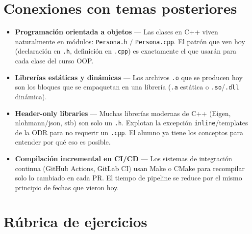 \documentclass[12pt, oneside]{article}
\begin{document}
\section{Conexiones con temas posteriores}

\begin{itemize}
  \item \textbf{Programación orientada a objetos} — Las clases en C++
    viven naturalmente en módulos: \texttt{Persona.h} / \texttt{Persona.cpp}.
    El patrón que ven hoy (declaración en \texttt{.h}, definición en
    \texttt{.cpp}) es exactamente el que usarán para cada clase del curso OOP.
  \item \textbf{Librerías estáticas y dinámicas} — Los archivos \texttt{.o}
    que se producen hoy son los bloques que se empaquetan en una librería
    (\texttt{.a} estática o \texttt{.so}/\texttt{.dll} dinámica).
  \item \textbf{Header-only libraries} — Muchas librerías modernas de C++
    (Eigen, nlohmann/json, stb) son solo un \texttt{.h}.  Explotan la
    excepción \texttt{inline}/templates de la ODR para no requerir un
    \texttt{.cpp}.  El alumno ya tiene los conceptos para entender por qué
    eso es posible.
  \item \textbf{Compilación incremental en CI/CD} — Los sistemas de
    integración continua (GitHub Actions, GitLab CI) usan Make o CMake
    para recompilar solo lo cambiado en cada PR.  El tiempo de pipeline
    se reduce por el mismo principio de fechas que vieron hoy.
\end{itemize}

\section{Rúbrica de ejercicios}
\end{document}
